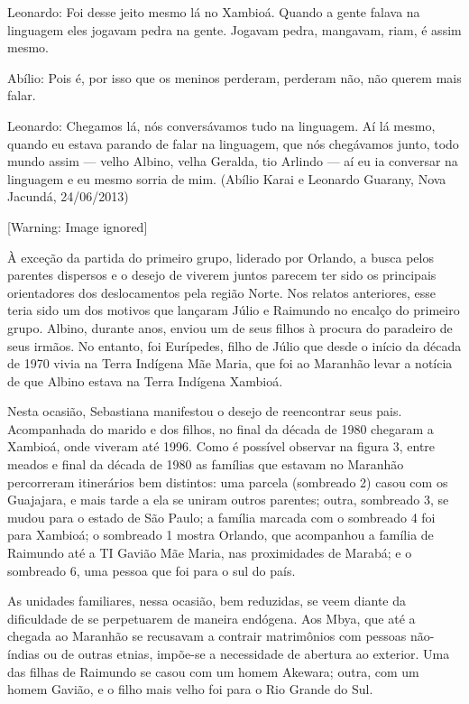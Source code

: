\documentclass{article}
\begin{document}
Leonardo: Foi desse jeito mesmo l\'a no Xambio\'a. Quando a gente falava
na linguagem eles jogavam pedra na gente. Jogavam pedra, mangavam,
riam, \'e assim mesmo. 

Ab\'ilio: Pois \'e, por isso que os meninos perderam, perderam n\~ao,
n\~ao querem mais falar.

Leonardo: Chegamos l\'a, n\'os convers\'avamos tudo na linguagem. A\'i
l\'a mesmo, quando eu estava parando de falar na linguagem, que n\'os
cheg\'avamos junto, todo mundo assim --- velho Albino, velha Geralda,
tio Arlindo --- a\'i eu ia conversar na linguagem e eu mesmo sorria de
mim. (Ab\'ilio Karai e Leonardo Guarany, Nova Jacund\'a, 24/06/2013)

  [Warning: Image ignored] %
 

\`A exce\c{c}\~ao da partida do primeiro grupo, liderado por Orlando, a
busca pelos parentes dispersos e o desejo de viverem juntos parecem ter
sido os principais orientadores dos deslocamentos pela regi\~ao Norte.
Nos relatos anteriores, esse teria sido um dos motivos que lan\c{c}aram
J\'ulio e Raimundo no encal\c{c}o do primeiro grupo. Albino, durante
anos, enviou um de seus filhos \`a procura do paradeiro de seus
irm\~aos. No entanto, foi Eur\'ipedes, filho de J\'ulio que desde o
in\'icio da d\'ecada de 1970 vivia na Terra Ind\'igena M\~ae Maria, que
foi ao Maranh\~ao levar a not\'icia de que Albino estava na Terra
Ind\'igena Xambio\'a.

Nesta ocasi\~ao, Sebastiana manifestou o desejo de reencontrar seus
pais. Acompanhada do marido e dos filhos, no final da d\'ecada de 1980
chegaram a Xambio\'a, onde viveram at\'e 1996. Como \'e poss\'ivel
observar na figura 3, entre meados e final da d\'ecada de 1980 as
fam\'ilias que estavam no Maranh\~ao percorreram itiner\'arios bem
distintos: uma parcela (sombreado 2) casou com os Guajajara, e mais
tarde a ela se uniram outros parentes; outra, sombreado 3, se mudou
para o estado de S\~ao Paulo; a fam\'ilia marcada com o sombreado 4 foi
para Xambio\'a; o sombreado 1 mostra Orlando, que acompanhou a
fam\'ilia de Raimundo at\'e a TI Gavi\~ao M\~ae Maria, nas proximidades
de Marab\'a; e o sombreado 6, uma pessoa que foi para o sul do pa\'is.

As unidades familiares, nessa ocasi\~ao, bem reduzidas, se veem diante
da dificuldade de se perpetuarem de maneira end\'ogena. Aos Mbya, que
at\'e a chegada ao Maranh\~ao se recusavam a contrair matrim\^onios com
pessoas n\~ao-\'indias ou de outras etnias, imp\~oe-se a necessidade de
abertura ao exterior. Uma das filhas de Raimundo se casou com um homem
Akewara; outra, com um homem Gavi\~ao, e o filho mais velho foi para o
Rio Grande do Sul. 
\end{document}
